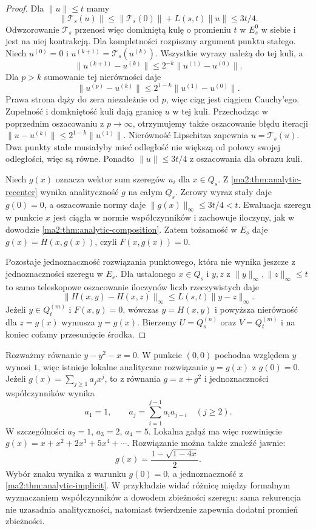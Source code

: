 \begin{proof}
Dla $\|u\|\le t$ mamy
\[
 \|\mathcal T_s(u)\|
 \le\|\mathcal T_s(0)\|+L(s,t)\|u\|
 \le 3t/4.
\]
Odwzorowanie $\mathcal T_s$ przenosi więc
domkniętą kulę o promieniu $t$ w $E_s^0$
w siebie i jest na niej kontrakcją.
Dla kompletności rozpiszmy argument
punktu stałego. Niech $u^{(0)}=0$ i
$u^{(k+1)}=\mathcal T_s(u^{(k)})$.
Wszystkie wyrazy należą do tej kuli, a
\[
 \|u^{(k+1)}-u^{(k)}\|
 \le 2^{-k}\|u^{(1)}-u^{(0)}\|.
\]
Dla $p>k$ sumowanie tej nierówności daje
\[
 \|u^{(p)}-u^{(k)}\|
 \le 2^{1-k}\|u^{(1)}-u^{(0)}\|.
\]
Prawa strona dąży do zera niezależnie od $p$,
więc ciąg jest ciągiem Cauchy'ego.
Zupełność i domkniętość kuli dają granicę $u$
w tej kuli. Przechodząc w poprzednim oszacowaniu
z $p\to\infty$, otrzymujemy także oszacowanie
błędu iteracji
$\|u-u^{(k)}\|\le 2^{1-k}\|u^{(1)}\|$.
Nierówność Lipschitza zapewnia
$u=\mathcal T_s(u)$.
Dwa punkty stałe musiałyby mieć
odległość nie większą od połowy
swojej odległości, więc są równe.
Ponadto $\|u\|\le3t/4$ z oszacowania
dla obrazu kuli.

Niech $g(x)$ oznacza wektor sum szeregów
$u_i$ dla $x\in Q_s$.
Z \ref{ma2:thm:analytic-recenter}
wynika analityczność $g$ na całym $Q_s$.
Zerowy wyraz stały daje $g(0)=0$,
a oszacowanie normy daje
$\|g(x)\|_\infty\le3t/4<t$.
Ewaluacja szeregu w punkcie $x$ jest
ciągła w normie współczynników
i zachowuje iloczyny, jak w dowodzie
\ref{ma2:thm:analytic-composition}.
Zatem tożsamość w $E_s$ daje
$g(x)=H(x,g(x))$, czyli $F(x,g(x))=0$.

Pozostaje jednoznaczność rozwiązania
punktowego, która nie wynika jeszcze
z jednoznaczności szeregu w $E_s$.
Dla ustalonego $x\in Q_s$ i $y,z$
z $\|y\|_\infty,\|z\|_\infty\le t$
to samo teleskopowe oszacowanie iloczynów
liczb rzeczywistych daje
\[
 \|H(x,y)-H(x,z)\|_\infty
 \le L(s,t)\|y-z\|_\infty.
\]
Jeżeli $y\in Q_t^{(m)}$ i $F(x,y)=0$,
wówczas $y=H(x,y)$
i powyższa nierówność dla $z=g(x)$
wymusza $y=g(x)$.
Bierzemy $U=Q_s^{(n)}$ oraz $V=Q_t^{(m)}$
i na koniec cofamy przesunięcie środka.
\end{proof}

\begin{przyklad}
\label{ma2:ex:analytic-implicit-quadratic}
Rozważmy równanie $y-y^2-x=0$.
W punkcie $(0,0)$ pochodna względem $y$
wynosi $1$, więc istnieje lokalne analityczne
rozwiązanie $y=g(x)$ z $g(0)=0$.
Jeżeli $g(x)=\sum_{j\ge1}a_jx^j$,
to z równania $g=x+g^2$ i jednoznaczności
współczynników wynika
\[
 a_1=1,\qquad a_j=\sum_{i=1}^{j-1}a_i a_{j-i}
 \quad(j\ge2).
\]
W szczególności $a_2=1$, $a_3=2$, $a_4=5$.
Lokalna gałąź ma więc rozwinięcie
$g(x)=x+x^2+2x^3+5x^4+\cdots$.
Rozwiązanie można także znaleźć jawnie:
\[
 g(x)=\frac{1-\sqrt{1-4x}}{2}.
\]
Wybór znaku wynika z warunku $g(0)=0$,
a jednoznaczność z
\ref{ma2:thm:analytic-implicit}.
W przykładzie widać różnicę między
formalnym wyznaczaniem współczynników
a dowodem zbieżności szeregu:
sama rekurencja nie uzasadnia analityczności,
natomiast twierdzenie zapewnia dodatni
promień zbieżności.
\end{przyklad}

